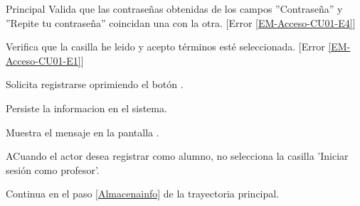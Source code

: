 \begin{UCtrayectoria}{Principal}
	    \UCpaso Valida que las contraseñas obtenidas de los campos ''Contraseña'' y ''Repite tu contraseña'' coincidan una con la otra. [Error  \ref{EM-Acceso-CU01-E4}]

	    \UCpaso Verifica que la casilla he leido y acepto términos esté seleccionada. [Error \ref{EM-Acceso-CU01-E1}]

	    \UCpaso [\UCactor] Solicita registrarse oprimiendo el botón .

	    \UCpaso Persiste la informacion en el sistema.

		\UCpaso Muestra el mensaje  en la pantalla .

\end{UCtrayectoria}

\begin{UCtrayectoriaA}{A}{Cuando el actor desea registrar como alumno, no selecciona la casilla 'Iniciar sesión como profesor'.}

	\UCpaso Continua en el paso \ref{Almacenainfo} de la trayectoria principal.

\end{UCtrayectoriaA}
